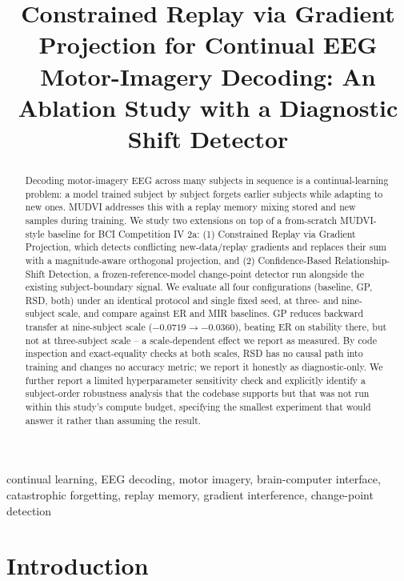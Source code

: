 \documentclass[conference]{IEEEtran}
\begin{document}
\title{Constrained Replay via Gradient Projection for Continual EEG Motor-Imagery Decoding: An Ablation Study with a Diagnostic Shift Detector}

\author{
}

\maketitle

\begin{abstract}
Decoding motor-imagery EEG across many subjects in sequence is a continual-learning problem: a model trained subject by subject forgets earlier subjects while adapting to new ones. MUDVI addresses this with a replay memory mixing stored and new samples during training. We study two extensions on top of a from-scratch MUDVI-style baseline for BCI Competition IV 2a: (1) Constrained Replay via Gradient Projection, which detects conflicting new-data/replay gradients and replaces their sum with a magnitude-aware orthogonal projection, and (2) Confidence-Based Relationship-Shift Detection, a frozen-reference-model change-point detector run alongside the existing subject-boundary signal. We evaluate all four configurations (baseline, GP, RSD, both) under an identical protocol and single fixed seed, at three- and nine-subject scale, and compare against ER and MIR baselines. GP reduces backward transfer at nine-subject scale ($-0.0719\to-0.0360$), beating ER on stability there, but not at three-subject scale -- a scale-dependent effect we report as measured. By code inspection and exact-equality checks at both scales, RSD has no causal path into training and changes no accuracy metric; we report it honestly as diagnostic-only. We further report a limited hyperparameter sensitivity check and explicitly identify a subject-order robustness analysis that the codebase supports but that was not run within this study's compute budget, specifying the smallest experiment that would answer it rather than assuming the result.
\end{abstract}

\begin{IEEEkeywords}
continual learning, EEG decoding, motor imagery, brain-computer interface, catastrophic forgetting, replay memory, gradient interference, change-point detection
\end{IEEEkeywords}

\section{Introduction}
\end{document}
